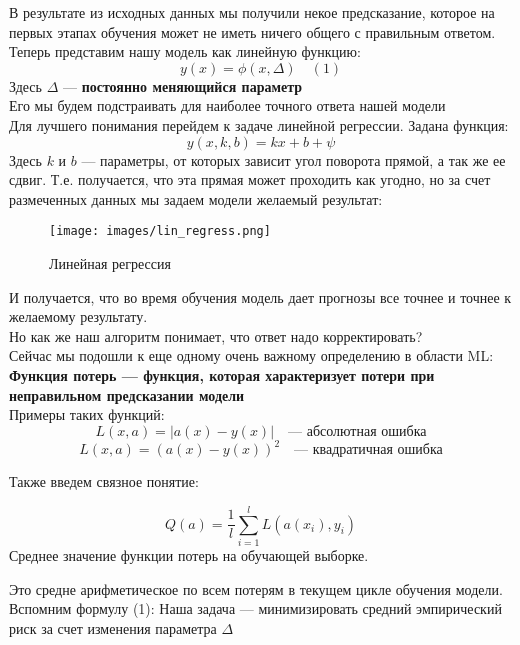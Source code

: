 В результате из исходных данных мы получили некое предсказание, которое на первых этапах обучения может не иметь ничего общего с правильным ответом. \\
\vspace{1cm}
Теперь представим нашу модель как линейную функцию:
\[
    y(x) = \phi (x, \Delta) \quad (1)
\]
Здесь \(\Delta\) — \textbf{постоянно меняющийся параметр} \\
Его мы будем подстраивать для наиболее точного ответа нашей модели \\
\vspace{1cm}
Для лучшего понимания перейдем к задаче линейной регрессии.
Задана функция:
\[
    y(x, k, b) = kx + b + \psi
\]
Здесь \(k\) и \(b\) — параметры, от которых зависит угол поворота прямой, а так же ее сдвиг.
Т.е. получается, что эта прямая может проходить как угодно, но за счет размеченных данных мы задаем модели желаемый результат:

\begin{figure}[htbp]
    \centering
    \texttt{[image: images/lin\_regress.png]}
    \caption{Линейная регрессия}
    \label{fig:example_lin-regress}
\end{figure}

И получается, что во время обучения модель дает прогнозы все точнее и точнее к желаемому результату. \\
\vspace{1cm}
Но как же наш алгоритм понимает, что ответ надо корректировать?\\
Сейчас мы подошли к еще одному очень важному определению в области ML: \\
\vspace{0.8cm}
\textbf{Функция потерь — функция, которая характеризует потери при неправильном предсказании модели} \\
Примеры таких функций:
\[
    L(x, a) = |a(x) - y(x)| \quad \text{— абсолютная ошибка}
\]
\[
    L(x, a) = (a(x) - y(x))^2 \quad \text{— квадратичная ошибка}
\]

\vspace{0.5cm}

Также введем связное понятие:
\begin{tcolorbox}[colback=gray!10, colframe=black, title=Средний эмпирический риск]
\[
    Q(a) = \frac{1}{l} \sum_{i=1}^l L(a(x_i), y_i)
\]
Среднее значение функции потерь на обучающей выборке.
\end{tcolorbox}

Это средне арифметическое по всем потерям в текущем цикле обучения модели. \\
\vspace{0.5cm}
Вспомним формулу (1):
Наша задача — минимизировать средний эмпирический риск за счет изменения параметра \(\Delta\) \\
\vspace{1.5cm}

